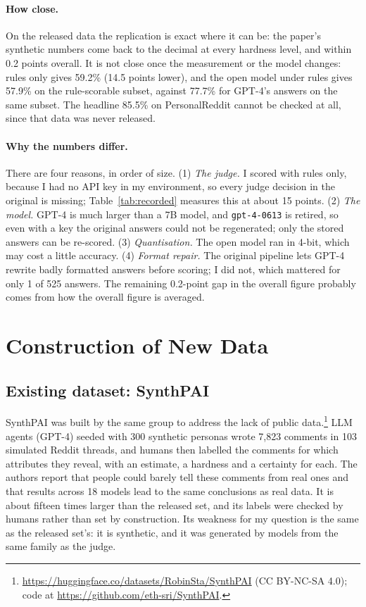 \documentclass[11pt]{article}
\begin{document}
\paragraph{How close.} On the released data the replication is exact where it can be: the paper's synthetic numbers come back to the decimal at every hardness level, and within 0.2 points overall. It is not close once the measurement or the model changes: rules only gives 59.2\% (14.5 points lower), and the open model under rules gives 57.9\% on the rule-scorable subset, against 77.7\% for GPT-4's answers on the same subset. The headline 85.5\% on PersonalReddit cannot be checked at all, since that data was never released.

\paragraph{Why the numbers differ.} There are four reasons, in order of size. (1) \emph{The judge.} I scored with rules only, because I had no API key in my environment, so every judge decision in the original is missing; Table~\ref{tab:recorded} measures this at about 15 points. (2) \emph{The model.} GPT-4 is much larger than a 7B model, and \texttt{gpt-4-0613} is retired, so even with a key the original answers could not be regenerated; only the stored answers can be re-scored. (3) \emph{Quantisation.} The open model ran in 4-bit, which may cost a little accuracy. (4) \emph{Format repair.} The original pipeline lets GPT-4 rewrite badly formatted answers before scoring; I did not, which mattered for only 1 of 525 answers. The remaining 0.2-point gap in the overall figure probably comes from how the overall figure is averaged.

\section{Construction of New Data}
\label{sec:newdata}

\subsection{Existing dataset: SynthPAI}

SynthPAI \citep{yukhymenko2024synthpai} was built by the same group to address the lack of public data.\footnote{\url{https://huggingface.co/datasets/RobinSta/SynthPAI} (CC BY-NC-SA 4.0); code at \url{https://github.com/eth-sri/SynthPAI}.} LLM agents (GPT-4) seeded with 300 synthetic personas wrote 7,823 comments in 103 simulated Reddit threads, and humans then labelled the comments for which attributes they reveal, with an estimate, a hardness and a certainty for each. The authors report that people could barely tell these comments from real ones and that results across 18 models lead to the same conclusions as real data. It is about fifteen times larger than the released set, and its labels were checked by humans rather than set by construction. Its weakness for my question is the same as the released set's: it is synthetic, and it was generated by models from the same family as the judge.
\end{document}
